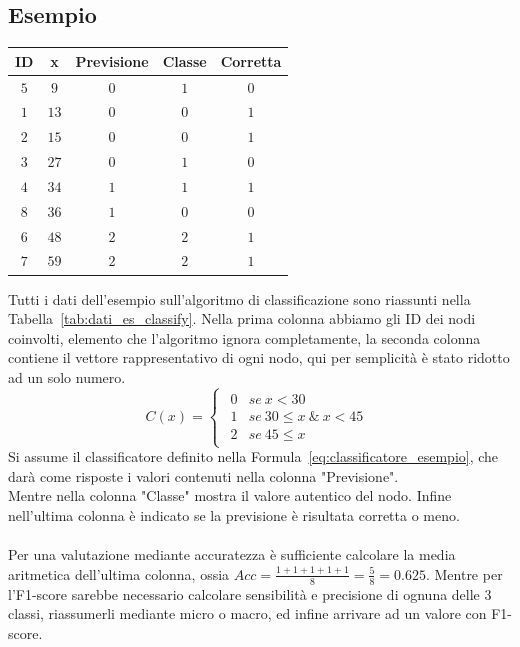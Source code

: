 \subsection{Esempio}
\begin{center}
	\begin{tabular}{|c|c|c|c|c|}
		\hline
		ID & x & Previsione & Classe & Corretta\\
		\hline
		$5$ & $9$ & $0$ & $1$ & $0$\\
		$1$ & $13$ & $0$ & $0$ & $1$\\
		$2$ & $15$ & $0$ & $0$ & $1$\\
		$3$ & $27$ & $0$ & $1$ & $0$\\
		$4$ & $34$ & $1$ & $1$ & $1$\\
		$8$ & $36$ & $1$ & $0$ & $0$\\
		$6$ & $48$ & $2$ & $2$ & $1$\\
		$7$ & $59$ & $2$ & $2$ & $1$\\
		\hline
	\end{tabular}
	\label{tab:dati_es_classify}
\end{center}
Tutti i dati dell'esempio sull'algoritmo di classificazione sono riassunti nella Tabella~\ref{tab:dati_es_classify}. Nella prima colonna abbiamo gli ID dei nodi coinvolti, elemento che l'algoritmo ignora completamente, la seconda colonna contiene il vettore rappresentativo di ogni nodo, qui per semplicità è stato ridotto ad un solo numero.
%
\begin{equation}
	C(x)=
		\begin{cases}
			\begin{array}{ll}
				0 & se \ x < 30\\
				1 & se \ 30 \leq x \ \&\  x < 45\\
				2 & se \ 45 \leq x
			\end{array}
		\end{cases}
	\label{eq:classificatore_esempio}
\end{equation}
%
Si assume il classificatore definito nella Formula~\ref{eq:classificatore_esempio}, che darà come risposte i valori contenuti nella colonna "Previsione".\\
Mentre nella colonna "Classe" mostra il valore autentico del nodo. Infine nell'ultima colonna è indicato se la previsione è risultata corretta o meno.\\
\\
Per una valutazione mediante accuratezza è sufficiente calcolare la media aritmetica dell'ultima colonna, ossia $\displaystyle Acc = \frac{1+1+1+1+1}{8} = \frac{5}{8} = 0.625$. Mentre per l'F1-score sarebbe necessario calcolare sensibilità e precisione di ognuna delle 3 classi, riassumerli mediante micro o macro, ed infine arrivare ad un valore con F1-score.
%

